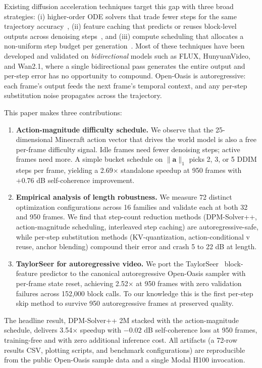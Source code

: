 \documentclass[10pt,letterpaper,twocolumn]{article}
\begin{document}
Existing diffusion acceleration techniques target this gap with three broad strategies: (i) higher-order ODE solvers that trade fewer steps for the same trajectory accuracy~\citep{lu2022dpmsolverpp,zhao2023unipc}, (ii) feature caching that predicts or reuses block-level outputs across denoising steps~\citep{liu2024teacache,zhang2025taylorseer,gao2025magcache}, and (iii) compute scheduling that allocates a non-uniform step budget per generation~\citep{nvidia2024adacache}. Most of these techniques have been developed and validated on \emph{bidirectional} models such as FLUX, HunyuanVideo, and Wan2.1, where a single bidirectional pass generates the entire output and per-step error has no opportunity to compound. Open-Oasis is autoregressive: each frame's output feeds the next frame's temporal context, and any per-step substitution noise propagates across the trajectory.

This paper makes three contributions:

\begin{enumerate}
\item \textbf{Action-magnitude difficulty schedule.} We observe that the 25-dimensional Minecraft action vector that drives the world model is also a free per-frame difficulty signal. Idle frames need fewer denoising steps; active frames need more. A simple bucket schedule on $\|\mathbf{a}\|_1$ picks 2, 3, or 5 DDIM steps per frame, yielding a 2.69$\times$ standalone speedup at 950 frames with $+0.76$ dB self-coherence improvement.
\item \textbf{Empirical analysis of length robustness.} We measure 72 distinct optimization configurations across 16 families and validate each at both 32 and 950 frames. We find that step-count reduction methods (DPM-Solver++, action-magnitude scheduling, interleaved step caching) are autoregressive-safe, while per-step substitution methods (KV-quantization, action-conditional v reuse, anchor blending) compound their error and crash 5 to 22 dB at length.
\item \textbf{TaylorSeer for autoregressive video.} We port the TaylorSeer~\citep{zhang2025taylorseer} block-feature predictor to the canonical autoregressive Open-Oasis sampler with per-frame state reset, achieving 2.52$\times$ at 950 frames with zero validation failures across 152{,}000 block calls. To our knowledge this is the first per-step skip method to survive 950 autoregressive frames at preserved quality.
\end{enumerate}

The headline result, DPM-Solver++ 2M stacked with the action-magnitude schedule, delivers 3.54$\times$ speedup with $-0.02$ dB self-coherence loss at 950 frames, training-free and with zero additional inference cost. All artifacts (a 72-row results CSV, plotting scripts, and benchmark configurations) are reproducible from the public Open-Oasis sample data and a single Modal H100 invocation.
\end{document}
